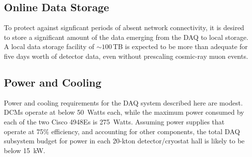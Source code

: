 \subsection{Online Data Storage}

To protect against signficant periods of absent network connectivity, it 
is desired to store a significant amount of the data emerging from the 
DAQ to local storage.  A local data storage facility of $\sim 100\,$TB is 
expected to be more than adequate for five days worth of detector data, 
even without prescaling cosmic-ray muon events.

\subsection{Power and Cooling}

Power and cooling requirements for the DAQ system described here are 
modest.  DCMs operate at below 50~Watts each, while the maximum power 
consumed by each of the two Cisco 4948Es is 275~Watts.  Assuming 
power supplies that operate at 75\% efficiency, and accounting for 
other components, the total DAQ subsystem budget for power 
in each 20-kton detector/cryostat hall is likely to be below 15~kW.


